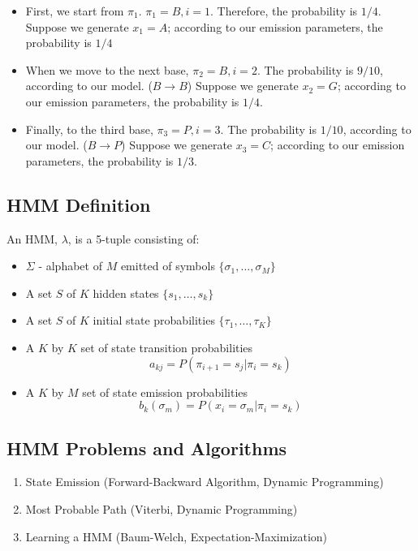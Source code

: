 \documentclass[10pt]{article}
\begin{document}
\begin{itemize}
	\item First, we start from $\pi_1$.  $\pi_1 = B, i = 1$.  Therefore, the probability is $1/4$.  Suppose we generate $x_1 = A$; according to our emission parameters, the probability is $1/4$
    \item When we move to the next base, $\pi_2 = B, i = 2$.  The probability is $9/10$, according to our model.  ($B \rightarrow B$)  Suppose we generate $x_2 = G$; according to our emission parameters, the probability is $1/4$.
    \item Finally, to the third base, $\pi_3 = P, i = 3$.  The probability is $1/10$, according to our model.  ($B \rightarrow P$)  Suppose we generate $x_3 = C$; according to our emission parameters, the probability is $1/3$.
\end{itemize}

\subsection*{HMM Definition}
An HMM, $\lambda$, is a 5-tuple consisting of:
\begin{itemize}
	\item $\Sigma$ - alphabet of $M$ emitted of symbols $\{\sigma_1, \dots, \sigma_M\}$
	\item A set $S$ of $K$ hidden states $\{s_1, \dots, s_k\}$
	\item A set $S$ of $K$ initial state probabilities $\{\tau_1, \dots, \tau_K\}$
	\item A $K$ by $K$ set of state transition probabilities
	\[a_{kj} = P(\pi_{i + 1} = s_j | \pi_i = s_k)\]
    \item A $K$ by $M$ set of state emission probabilities
    \[b_k(\sigma_m) = P(x_i = \sigma_m|\pi_i = s_k)\]
\end{itemize}

\subsection*{HMM Problems and Algorithms}
\begin{enumerate}
    \item State Emission (Forward-Backward Algorithm, Dynamic Programming)
    \item Most Probable Path (Viterbi, Dynamic Programming)
    \item Learning a HMM (Baum-Welch, Expectation-Maximization)
\end{enumerate}
\end{document}
